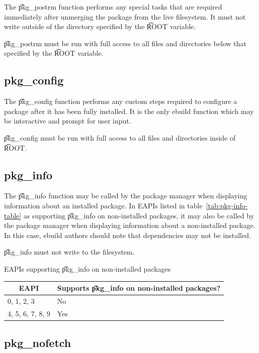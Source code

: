 The \t{pkg_postrm} function performs any special tasks that are required immediately after
unmerging the package from the live filesystem. It must not write outside of the directory specified
by the \t{ROOT} variable.

\t{pkg_postrm} must be run with full access to all files and directories below that specified by
the \t{ROOT} variable.

\subsection{pkg_config}

The \t{pkg_config} function performs any custom steps required to configure a package after it has
been fully installed. It is the only ebuild function which may be interactive and prompt for user
input.

\t{pkg_config} must be run with full access to all files and directories inside of \t{ROOT}.

\subsection{pkg_info}

 The \t{pkg_info} function may be called by the package manager when
displaying information about an installed package. In EAPIs listed in table~\ref{tab:pkg-info-table}
as supporting \t{pkg_info} on non-installed packages, it may also be called by the package manager
when displaying information about a non-installed package. In this case, ebuild authors should note
that dependencies may not be installed.

\t{pkg_info} must not write to the filesystem.

\begin{centertable}{EAPIs supporting \t{pkg_info} on non-installed packages}
    \label{tab:pkg-info-table}
    \begin{tabular}{ll}
      \toprule
      \multicolumn{1}{c}{\textbf{EAPI}} &
      \multicolumn{1}{c}{\textbf{Supports \t{pkg_info} on non-installed packages?}} \\
      \midrule
      0, 1, 2, 3        & No  \\
      4, 5, 6, 7, 8, 9  & Yes \\
      \bottomrule
    \end{tabular}
\end{centertable}

\subsection{pkg_nofetch}

